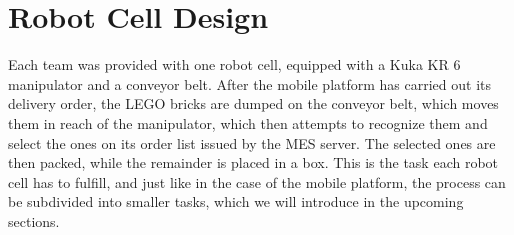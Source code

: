 \chapter{Robot Cell Design}\label{chap:robot_cell_chapter}

Each team was provided with one robot cell, equipped with a Kuka KR 6 manipulator and a conveyor belt. After the mobile platform has carried out its delivery order, the LEGO bricks are dumped on the conveyor belt, which moves them in reach of the manipulator, which then attempts to recognize them and select the ones on its order list issued by the MES server. The selected ones are then packed, while the remainder is placed in a box. This is the task each robot cell has to fulfill, and just like in the case of the mobile platform, the process can be subdivided into smaller tasks, which we will introduce in the upcoming sections.
















